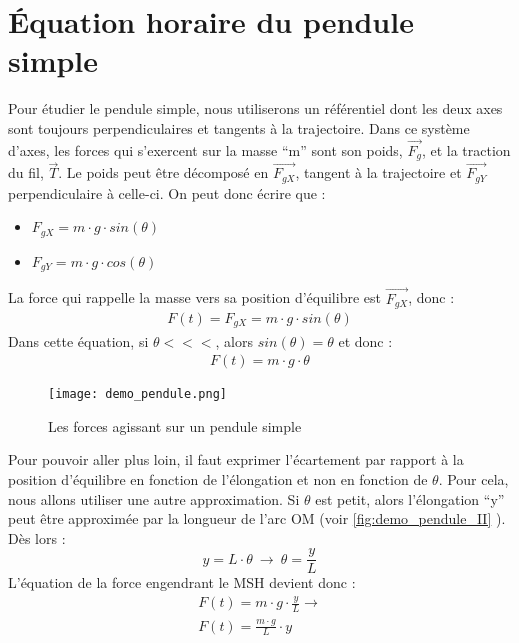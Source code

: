 \section{Équation horaire du pendule simple}
Pour étudier le pendule simple, nous utiliserons un référentiel dont les deux axes sont toujours perpendiculaires et tangents à la trajectoire.
Dans ce système d'axes, les forces qui s'exercent sur la masse \enquote{m} sont son poids, \(\vec{F_g}\), et la traction du fil, \(\vec{T}\). Le poids peut être décomposé en \(\vec{F_{gX}}\), tangent à la trajectoire et \(\vec{F_{gY}}\) perpendiculaire à celle-ci.
On peut donc écrire que :
\begin{itemize}
    \item \(F_{gX}=m \cdot g  \cdot sin(\theta)\)
    \item \(F_{gY}=m \cdot g  \cdot cos(\theta)\)
\end{itemize}



La force qui rappelle la masse vers sa position d'équilibre est \(\vec{F_{gX}}\), donc :
\begin{align}
    F(t)=F_{gX}=m \cdot g \cdot sin(\theta)
\end{align}
Dans cette équation, si \(\theta <<<\), alors \(sin(\theta)=\theta\) et donc :
\begin{align}
    F(t)=m \cdot g \cdot \theta
\end{align}


\begin{figure}[ht!]
    \centering
    \texttt{[image: demo\_pendule.png]}
    \caption{Les forces agissant sur un pendule simple}
    \label{demo_pendule_I}
\end{figure}

\newpage

Pour pouvoir aller plus loin, il faut exprimer l'écartement par rapport à la position d'équilibre en fonction de l'élongation et non en fonction de \(\theta\).
Pour cela, nous allons utiliser une autre approximation.
Si \(\theta\) est petit, alors l'élongation \enquote{y} peut être approximée par la longueur de l'arc OM (voir \cref{fig:demo_pendule_II} ).
Dès lors :
\begin{equation}
    y=L \cdot \theta \ \rightarrow \ \theta=\frac{y}{L}
\end{equation}
L'équation de la force engendrant le MSH devient donc :
\begin{align}
    F(t)=m \cdot g \cdot \frac{y}{L} \rightarrow \\
    F(t)=\frac{m \cdot g}{L} \cdot y
\end{align}

